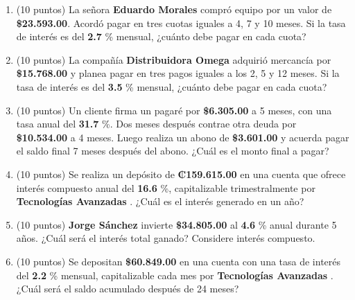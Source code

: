 \documentclass[10pt]{article}
\begin{document}
\begin{enumerate}[leftmargin=*, label=\textbf{\arabic*.}]
  \item (10 puntos) La señora \textbf{ Eduardo Morales } compró equipo por un valor de \textbf{\$\num{ 23,593.00 }}. Acordó pagar en tres cuotas iguales a 4, 7 y 10 meses. Si la tasa de interés es del \textbf{ 2.7 }\% mensual, ¿cuánto debe pagar en cada cuota?

  \vspace{0.5cm}

  \item (10 puntos) La compañía \textbf{ Distribuidora Omega } adquirió mercancía por \textbf{\$\num{ 15,768.00 }} y planea pagar en tres pagos iguales a los 2, 5 y 12 meses. Si la tasa de interés es del \textbf{ 3.5 }\% mensual, ¿cuánto debe pagar en cada cuota?

  \vspace{0.5cm}

  \item (10 puntos) Un cliente firma un pagaré por \textbf{\$\num{ 6,305.00 }} a 5 meses, con una tasa anual del \textbf{ 31.7 }\%. Dos meses después contrae otra deuda por \textbf{\$\num{ 10,534.00 }} a 4 meses. Luego realiza un abono de \textbf{\$\num{ 3,601.00 }} y acuerda pagar el saldo final 7 meses después del abono. ¿Cuál es el monto final a pagar?

  \vspace{0.5cm}

  \item (10 puntos) Se realiza un depósito de \textbf{₡\num{ 159.615.00 }} en una cuenta que ofrece interés compuesto anual del \textbf{ 16.6 }\%, capitalizable trimestralmente por \textbf{ Tecnologías Avanzadas }. ¿Cuál es el interés generado en un año?

  \vspace{0.5cm}

  \item (10 puntos) \textbf{ Jorge Sánchez } invierte \textbf{\$\num{ 34,805.00 }} al \textbf{ 4.6 }\% anual durante 5 años. ¿Cuál será el interés total ganado? Considere interés compuesto.

  \vspace{0.5cm}

  \item (10 puntos) Se depositan \textbf{\$\num{ 60,849.00 }} en una cuenta con una tasa de interés del \textbf{ 2.2 }\% mensual, capitalizable cada mes por \textbf{ Tecnologías Avanzadas }. ¿Cuál será el saldo acumulado después de 24 meses?
\end{enumerate}
\end{document}
